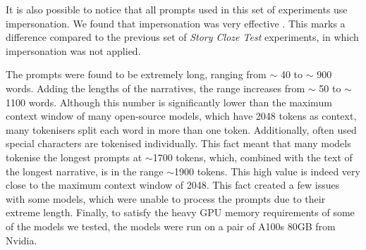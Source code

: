 It is also possible to notice that all prompts used in this set of experiments use impersonation. We found that impersonation was very effective \cite{impersonation}. This marks a difference compared to the previous set of \emph{Story Cloze Test} experiments, in which impersonation was not applied.

The prompts were found to be extremely long, ranging from $\sim$ 40  to $\sim$ 900 words. Adding the lengths of the narratives, the range increases from $\sim$ 50 to $\sim$ 1100 words. Although this number is significantly lower than the maximum context window of many open-source models, which have 2048 tokens as context, many tokenisers split each word in more than one token. Additionally, often used special characters are tokenised individually. This fact meant that many models tokenise the longest prompts at $\sim$1700 tokens, which, combined with the text of the longest narrative, is in the range $\sim$1900 tokens. This high value is indeed very close to the maximum context window of 2048. This fact created a few issues with some models, which were unable to process the prompts due to their extreme length. 
Finally, to satisfy the heavy GPU memory requirements of some of the models we tested, the models were run on a pair of A100s 80GB from Nvidia. 
